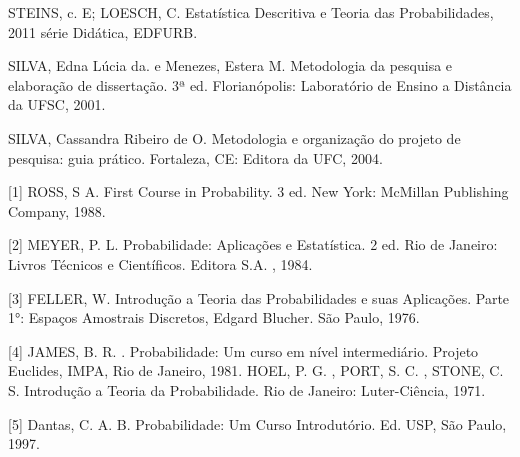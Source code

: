 STEINS, c. E; LOESCH, C. Estatística Descritiva e Teoria das Probabilidades, 2011 série Didática, EDFURB.\vskip0.3cm

SILVA, Edna Lúcia da. e Menezes, Estera M. Metodologia da pesquisa e elaboração de dissertação. 3ª ed. Florianópolis: Laboratório de Ensino a Distância da UFSC, 2001.\vskip0.3cm

SILVA, Cassandra Ribeiro de O. Metodologia e organização do projeto de pesquisa: guia prático. Fortaleza, CE: Editora da UFC, 2004.\vskip0.3cm

[1] ROSS, S A. First Course in Probability. 3 ed. New York:
McMillan Publishing Company, 1988.\vskip0.3cm


[2] MEYER, P. L. Probabilidade: Aplicações e Estatística. 2 ed.
Rio de Janeiro: Livros Técnicos e Científicos. Editora S.A. ,
1984.\vskip0.3cm


[3] FELLER, W. Introdução a Teoria das Probabilidades e suas
Aplicações. Parte 1°: Espaços Amostrais Discretos, Edgard Blucher.
São Paulo, 1976.\vskip0.3cm


[4] JAMES, B. R. . Probabilidade: Um curso em nível intermediário.
Projeto Euclides, IMPA, Rio de Janeiro, 1981. HOEL, P. G. , PORT,
S. C. , STONE, C. S. Introdução a Teoria da Probabilidade. Rio de
Janeiro: Luter-Ciência, 1971.\vskip0.3cm

[5] Dantas, C. A. B. Probabilidade: Um Curso Introdutório. Ed.
USP, São Paulo, 1997.